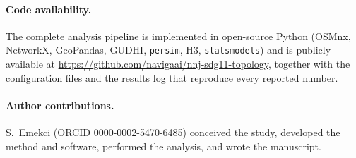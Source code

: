 \paragraph{Code availability.} The complete analysis pipeline is implemented in
open-source Python (OSMnx, NetworkX, GeoPandas, GUDHI, \texttt{persim}, H3,
\texttt{statsmodels}) and is publicly available at
\url{https://github.com/navigaai/nnj-sdg11-topology}, together with the
configuration files and the results log that reproduce every reported number.

\paragraph{Author contributions.} S.\ Emekci (ORCID 0000-0002-5470-6485) conceived
the study, developed the method and software, performed the analysis, and wrote
the manuscript.
